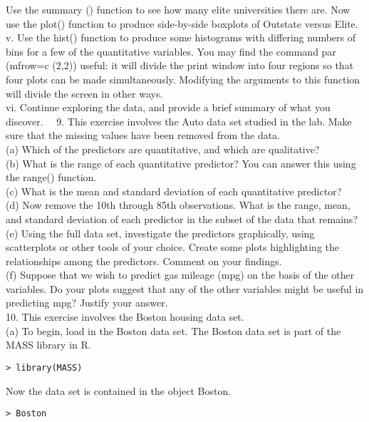\documentclass[10pt]{article}
\begin{document}
Use the summary () function to see how many elite universities there are. Now use the plot() function to produce side-by-side boxplots of Outstate versus Elite.\\
v. Use the hist() function to produce some histograms with differing numbers of bins for a few of the quantitative variables. You may find the command par (mfrow=c (2,2)) useful: it will divide the print window into four regions so that four plots can be made simultaneously. Modifying the arguments to this function will divide the screen in other ways.\\
vi. Continue exploring the data, and provide a brief summary of what you discover.\
\
9. This exercise involves the Auto data set studied in the lab. Make sure that the missing values have been removed from the data.\\
(a) Which of the predictors are quantitative, and which are qualitative?\\
(b) What is the range of each quantitative predictor? You can answer this using the range() function.\\
(c) What is the mean and standard deviation of each quantitative predictor?\\
(d) Now remove the 10th through 85th observations. What is the range, mean, and standard deviation of each predictor in the subset of the data that remains?\\
(e) Using the full data set, investigate the predictors graphically, using scatterplots or other tools of your choice. Create some plots highlighting the relationships among the predictors. Comment on your findings.\\
(f) Suppose that we wish to predict gas mileage (mpg) on the basis of the other variables. Do your plots suggest that any of the other variables might be useful in predicting mpg? Justify your answer.\\
10. This exercise involves the Boston housing data set.\\
(a) To begin, load in the Boston data set. The Boston data set is part of the MASS library in R.

\begin{verbatim}
> library(MASS)
\end{verbatim}

Now the data set is contained in the object Boston.

\begin{verbatim}
> Boston
\end{verbatim}
\end{document}

